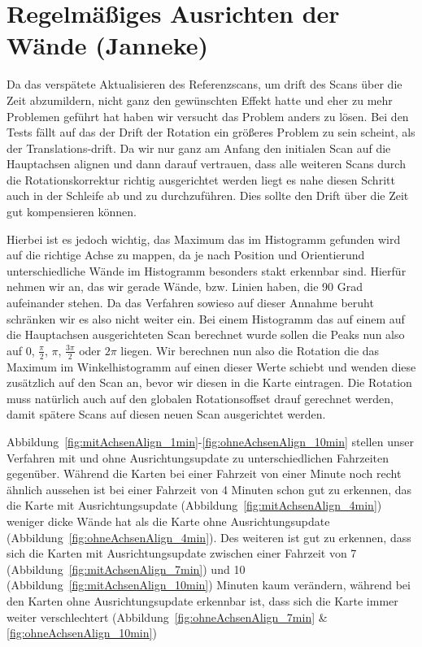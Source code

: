 \section{Regelmäßiges Ausrichten der Wände (Janneke)}

Da das verspätete Aktualisieren des Referenzscans, um drift des Scans über die Zeit abzumildern, nicht ganz den gewünschten Effekt hatte und eher zu mehr Problemen geführt hat haben wir versucht das Problem anders zu lösen. Bei den Tests fällt auf das der Drift der Rotation ein größeres Problem zu sein scheint, als der Translations-drift. Da wir nur ganz am Anfang den initialen Scan auf die Hauptachsen alignen und dann darauf vertrauen, dass alle weiteren Scans durch die Rotationskorrektur richtig ausgerichtet werden liegt es nahe diesen Schritt auch in der Schleife ab und zu durchzuführen. Dies sollte den Drift über die Zeit gut kompensieren können.

Hierbei ist es jedoch wichtig, das Maximum das im Histogramm gefunden wird auf die richtige Achse zu mappen, da je nach Position und Orientierund unterschiedliche Wände im Histogramm besonders stakt erkennbar sind. Hierfür nehmen wir an, das wir gerade Wände, bzw. Linien haben, die 90 Grad aufeinander stehen. Da das Verfahren sowieso auf dieser Annahme beruht schränken wir es also nicht weiter ein. Bei einem Histogramm das auf einem auf die Hauptachsen ausgerichteten Scan berechnet wurde sollen die Peaks nun also auf 0, $\frac{\pi}{2}$, $\pi$, $\frac{3\pi}{2}$ oder $2\pi$ liegen. Wir berechnen nun also die Rotation die das Maximum im Winkelhistogramm auf einen dieser Werte schiebt und wenden diese zusätzlich auf den Scan an, bevor wir diesen in die Karte eintragen. Die Rotation muss natürlich auch auf den globalen Rotationsoffset drauf gerechnet werden, damit spätere Scans auf diesen neuen Scan ausgerichtet werden.

Abbildung~\ref{fig:mitAchsenAlign_1min}-\ref{fig:ohneAchsenAlign_10min} stellen unser Verfahren mit und ohne Ausrichtungsupdate zu unterschiedlichen Fahrzeiten gegenüber. Während die Karten bei einer Fahrzeit von einer Minute noch recht ähnlich aussehen ist bei einer Fahrzeit von 4 Minuten schon gut zu erkennen, das die Karte mit Ausrichtungsupdate (Abbildung~\ref{fig:mitAchsenAlign_4min}) weniger dicke Wände hat als die Karte ohne Ausrichtungsupdate (Abbildung~\ref{fig:ohneAchsenAlign_4min}). Des weiteren ist gut zu erkennen, dass sich die Karten mit Ausrichtungsupdate zwischen einer Fahrzeit von 7 (Abbildung~\ref{fig:mitAchsenAlign_7min}) und 10 (Abbildung~\ref{fig:mitAchsenAlign_10min}) Minuten kaum verändern, während bei den Karten ohne Ausrichtungsupdate erkennbar ist, dass sich die Karte immer weiter verschlechtert (Abbildung~\ref{fig:ohneAchsenAlign_7min} \& \ref{fig:ohneAchsenAlign_10min})  

